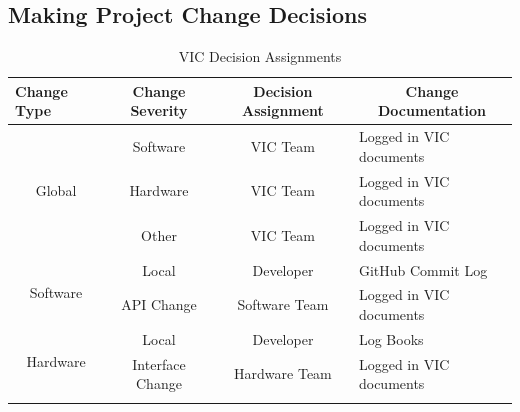 \documentclass [12pt]{article}
\begin{document}
\subsection{Making Project Change Decisions} 
\begin{longtable}{| p{ } | p{ } | p{ } | p{ } |}
\hline
\centering \textbf{Change Type} & 
\multicolumn{1}{c|}{\textbf {Change Severity}} &
\multicolumn{1}{c}{\textbf {Decision Assignment}} & 
\multicolumn{1}{|c|}{\textbf {Change Documentation}}  \\ \hline

\multicolumn{1}{|c|}{\multirow{3}{*}{Global}} & 
\multicolumn{1}{c}{Software} &
\multicolumn{1}{|c|}{VIC Team} &
Logged in VIC documents	\\\cline{2-4}

 & \multicolumn{1}{c}{Hardware} & 
 \multicolumn{1}{|c|}{VIC Team} &
Logged in VIC documents\\ \cline{2-4}
  
   & \multicolumn{1}{c}{Other} & 
 \multicolumn{1}{|c|}{VIC Team} &
Logged in VIC documents\\ \hline
 
 
\multicolumn{1}{|c|}{\multirow{2}{*}{Software}} & 
\multicolumn{1}{c}{Local} &
\multicolumn{1}{|c|}{Developer}&
GitHub Commit Log \\\cline{2-4}
 
 & 
\multicolumn{1}{c}{API Change} &
\multicolumn{1}{|c|}{Software Team}&
Logged in VIC documents \\ \hline


\multicolumn{1}{|c|}{\multirow{2}{*}{Hardware}} & 
\multicolumn{1}{c}{Local} &
\multicolumn{1}{|c|}{Developer}&
Log Books \\\cline{2-4}
 
 & 
\multicolumn{1}{c}{Interface Change} &
\multicolumn{1}{|c|}{Hardware Team}&
Logged in VIC documents \\ \hline

\caption {VIC Decision Assignments}

\end{longtable}

\end{document}

